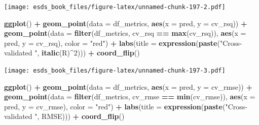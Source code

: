 \documentclass[
]{book}
\newenvironment{Shaded}{\begin{snugshade}}{\end{snugshade}}
\newcommand{\DataTypeTok}[1]{\textcolor[rgb]{0.13,0.29,0.53}{#1}}
\newcommand{\DecValTok}[1]{\textcolor[rgb]{0.00,0.00,0.81}{#1}}
\newcommand{\KeywordTok}[1]{\textcolor[rgb]{0.13,0.29,0.53}{\textbf{#1}}}
\newcommand{\NormalTok}[1]{#1}
\newcommand{\OperatorTok}[1]{\textcolor[rgb]{0.81,0.36,0.00}{\textbf{#1}}}
\newcommand{\StringTok}[1]{\textcolor[rgb]{0.31,0.60,0.02}{#1}}
\begin{document}
\texttt{[image: esds\_book\_files/figure-latex/unnamed-chunk-197-2.pdf]}

\begin{Shaded}
\begin{Highlighting}[]
\KeywordTok{ggplot}\NormalTok{() }\OperatorTok{+}
\StringTok{  }\KeywordTok{geom_point}\NormalTok{(}\DataTypeTok{data =}\NormalTok{ df_metrics, }\KeywordTok{aes}\NormalTok{(}\DataTypeTok{x =}\NormalTok{ pred, }\DataTypeTok{y =}\NormalTok{ cv_rsq)) }\OperatorTok{+}
\StringTok{  }\KeywordTok{geom_point}\NormalTok{(}\DataTypeTok{data =} \KeywordTok{filter}\NormalTok{(df_metrics, cv_rsq }\OperatorTok{==}\StringTok{ }\KeywordTok{max}\NormalTok{(cv_rsq)), }\KeywordTok{aes}\NormalTok{(}\DataTypeTok{x =}\NormalTok{ pred, }\DataTypeTok{y =}\NormalTok{ cv_rsq), }\DataTypeTok{color =} \StringTok{"red"}\NormalTok{) }\OperatorTok{+}
\StringTok{  }\KeywordTok{labs}\NormalTok{(}\DataTypeTok{title =} \KeywordTok{expression}\NormalTok{(}\KeywordTok{paste}\NormalTok{(}\StringTok{"Cross-validated "}\NormalTok{, }\KeywordTok{italic}\NormalTok{(R)}\OperatorTok{^}\DecValTok{2}\NormalTok{))) }\OperatorTok{+}\StringTok{ }
\StringTok{  }\KeywordTok{coord_flip}\NormalTok{()}
\end{Highlighting}
\end{Shaded}

\texttt{[image: esds\_book\_files/figure-latex/unnamed-chunk-197-3.pdf]}

\begin{Shaded}
\begin{Highlighting}[]
\KeywordTok{ggplot}\NormalTok{() }\OperatorTok{+}
\StringTok{  }\KeywordTok{geom_point}\NormalTok{(}\DataTypeTok{data =}\NormalTok{ df_metrics, }\KeywordTok{aes}\NormalTok{(}\DataTypeTok{x =}\NormalTok{ pred, }\DataTypeTok{y =}\NormalTok{ cv_rmse)) }\OperatorTok{+}
\StringTok{  }\KeywordTok{geom_point}\NormalTok{(}\DataTypeTok{data =} \KeywordTok{filter}\NormalTok{(df_metrics, cv_rmse }\OperatorTok{==}\StringTok{ }\KeywordTok{min}\NormalTok{(cv_rmse)), }\KeywordTok{aes}\NormalTok{(}\DataTypeTok{x =}\NormalTok{ pred, }\DataTypeTok{y =}\NormalTok{ cv_rmse), }\DataTypeTok{color =} \StringTok{"red"}\NormalTok{) }\OperatorTok{+}
\StringTok{  }\KeywordTok{labs}\NormalTok{(}\DataTypeTok{title =} \KeywordTok{expression}\NormalTok{(}\KeywordTok{paste}\NormalTok{(}\StringTok{"Cross-validated "}\NormalTok{, RMSE))) }\OperatorTok{+}\StringTok{ }
\StringTok{  }\KeywordTok{coord_flip}\NormalTok{()}
\end{Highlighting}
\end{Shaded}
\end{document}

